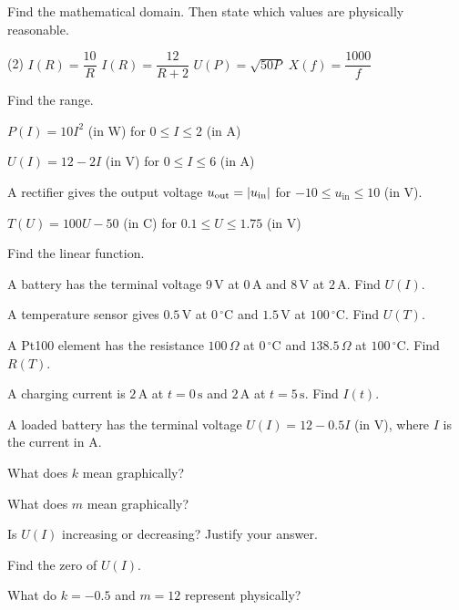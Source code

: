 Find the mathematical domain. Then state which values are physically reasonable.
\begin{delar}(2)
  \task $I(R) = \dfrac{10}{R}$
  \task $I(R) = \dfrac{12}{R + 2}$
  \task $U(P) = \sqrt{50P}$
  \task $X(f) = \dfrac{1000}{f}$
\end{delar}

Find the range.
\begin{parts}
  \item $P(I) = 10I^2$ (in W) for $0 \leq I \leq 2$ (in A)
  \item $U(I) = 12 - 2I$ (in V) for $0 \leq I \leq 6$ (in A)
  \item A rectifier gives the output voltage $u_{\text{out}} = \lvert u_{\text{in}}\rvert$ for $-10 \leq
    u_{\text{in}} \leq 10$ (in V).
  \item $T(U) = 100U - 50$ (in \textdegree C) for $0.1 \leq U \leq 1.75$ (in V)
\end{parts}

Find the linear function.
\begin{parts}
  \item A battery has the terminal voltage $9\,\text{V}$ at $0\,\text{A}$ and $8\,\text{V}$ at
    $2\,\text{A}$. Find $U(I)$.
  \item A temperature sensor gives $0.5\,\text{V}$ at $0\,^{\circ}\text{C}$ and $1.5\,\text{V}$ at
    $100\,^{\circ}\text{C}$. Find $U(T)$.
  \item A Pt100 element has the resistance $100\,\Omega$ at $0\,^{\circ}\text{C}$ and
    $138.5\,\Omega$ at $100\,^{\circ}\text{C}$. Find $R(T)$.
  \item A charging current is $2\,\text{A}$ at $t = 0\,\text{s}$ and $2\,\text{A}$ at $t =
    5\,\text{s}$. Find $I(t)$.
\end{parts}

A loaded battery has the terminal voltage $U(I) = 12 - 0.5I$ (in V), where $I$ is the current in
A.
\begin{parts}
  \item What does $k$ mean graphically?
  \item What does $m$ mean graphically?
  \item Is $U(I)$ increasing or decreasing? Justify your answer.
  \item Find the zero of $U(I)$.
  \item What do $k = -0.5$ and $m = 12$ represent physically?
\end{parts}

